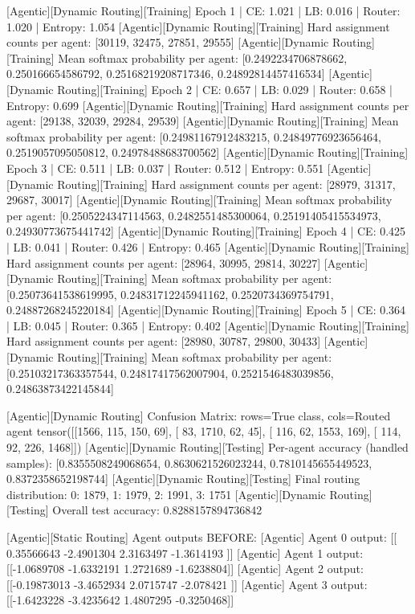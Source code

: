 [Agentic][Dynamic Routing][Training] Epoch 1 | CE: 1.021 | LB: 0.016 | Router: 1.020 | Entropy: 1.054
[Agentic][Dynamic Routing][Training] Hard assignment counts per agent: [30119, 32475, 27851, 29555]
[Agentic][Dynamic Routing][Training] Mean softmax probability per agent: [0.2492234706878662, 0.250166654586792, 0.25168219208717346, 0.24892814457416534]
[Agentic][Dynamic Routing][Training] Epoch 2 | CE: 0.657 | LB: 0.029 | Router: 0.658 | Entropy: 0.699
[Agentic][Dynamic Routing][Training] Hard assignment counts per agent: [29138, 32039, 29284, 29539]
[Agentic][Dynamic Routing][Training] Mean softmax probability per agent: [0.24981167912483215, 0.24849776923656464, 0.2519057095050812, 0.24978488683700562]
[Agentic][Dynamic Routing][Training] Epoch 3 | CE: 0.511 | LB: 0.037 | Router: 0.512 | Entropy: 0.551
[Agentic][Dynamic Routing][Training] Hard assignment counts per agent: [28979, 31317, 29687, 30017]
[Agentic][Dynamic Routing][Training] Mean softmax probability per agent: [0.2505224347114563, 0.2482551485300064, 0.25191405415534973, 0.24930773675441742]
[Agentic][Dynamic Routing][Training] Epoch 4 | CE: 0.425 | LB: 0.041 | Router: 0.426 | Entropy: 0.465
[Agentic][Dynamic Routing][Training] Hard assignment counts per agent: [28964, 30995, 29814, 30227]
[Agentic][Dynamic Routing][Training] Mean softmax probability per agent: [0.25073641538619995, 0.24831712245941162, 0.2520734369754791, 0.24887268245220184]
[Agentic][Dynamic Routing][Training] Epoch 5 | CE: 0.364 | LB: 0.045 | Router: 0.365 | Entropy: 0.402
[Agentic][Dynamic Routing][Training] Hard assignment counts per agent: [28980, 30787, 29800, 30433]
[Agentic][Dynamic Routing][Training] Mean softmax probability per agent: [0.25103217363357544, 0.24817417562007904, 0.2521546483039856, 0.24863873422145844]

[Agentic][Dynamic Routing] Confusion Matrix: rows=True class, cols=Routed agent
tensor([[1566,  115,  150,   69],
[  83, 1710,   62,   45],
[ 116,   62, 1553,  169],
[ 114,   92,  226, 1468]])
[Agentic][Dynamic Routing][Testing] Per-agent accuracy (handled samples): [0.8355508249068654, 0.8630621526023244, 0.7810145655449523, 0.8372358652198744]
[Agentic][Dynamic Routing][Testing] Final routing distribution: {0: 1879, 1: 1979, 2: 1991, 3: 1751}
[Agentic][Dynamic Routing][Testing] Overall test accuracy: 0.8288157894736842

[Agentic][Static Routing] Agent outputs BEFORE:
[Agentic] Agent 0 output: [[ 0.35566643 -2.4901304   2.3163497  -1.3614193 ]]
[Agentic] Agent 1 output: [[-1.0689708 -1.6332191  1.2721689 -1.6238804]]
[Agentic] Agent 2 output: [[-0.19873013 -3.4652934   2.0715747  -2.078421  ]]
[Agentic] Agent 3 output: [[-1.6423228 -3.4235642  1.4807295 -0.3250468]]

